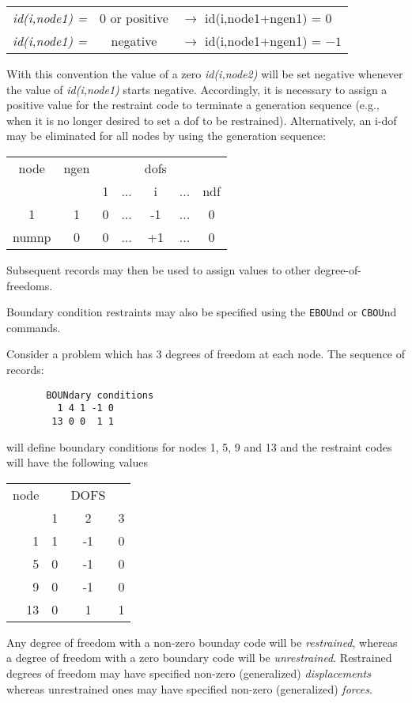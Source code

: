 \begin{center}
\begin{tabular}{rc l}
\it id(i,node1) =& 0 or positive &$\rightarrow$ id(i,node1+ngen1) =
\phantom{$-$}0 \\
\it id(i,node1) =& negative      &$\rightarrow$ id(i,node1+ngen1) = $-1$
\end{tabular}
\end{center}
With this convention the value of a zero {\it id(i,node2)} will be set
negative whenever the value of {\it id(i,node1)} starts negative.
Accordingly, it is necessary to assign a positive value for
the restraint code to terminate a generation sequence (e.g.,
when it is no longer desired to set a dof to be restrained).
Alternatively, an i-dof may be eliminated for all nodes by
using the generation sequence:

\begin{center}
\begin{tabular}{c|c|ccccc}
node  & ngen &   &     & dofs &     &  \\
      &      & 1 & ... &  i   & ... & ndf \\ \hline
1     & 1    & 0 & ... & -1   & ... & 0 \\
numnp & 0    & 0 & ... & +1   & ... & 0 
\end{tabular}
\end{center}
Subsequent records may then be used to assign values to
other degree-of-freedoms.

Boundary condition restraints may also be specified using the {\tt EBOU}nd
or {\tt CBOU}nd commands.


Consider a problem which has 3 degrees of freedom at each node.  The
sequence of records:
\begin{verbatim}
       BOUNdary conditions
         1 4 1 -1 0
        13 0 0  1 1

\end{verbatim}
will define boundary conditions for nodes 1, 5, 9 and 13 and the restraint
codes will have the following values
\begin{center}
\begin{tabular}{r|ccc}
node  &    & DOFS & \\
      &  1 &  2 & 3  \\ \hline
 1    &  1 & -1 & 0 \\
 5    &  0 & -1 & 0 \\
 9    &  0 & -1 & 0 \\
13    &  0 &  1 & 1 \\
\end{tabular}
\end{center}

Any degree of freedom with a non-zero bounday code will be \textit{restrained},
whereas a degree of freedom with a zero boundary code will be
\textit{unrestrained}.  Restrained degrees of freedom may have specified
non-zero (generalized) \textit{displacements} whereas unrestrained ones may
have specified non-zero (generalized) \textit{forces}.
\vfil\eject
